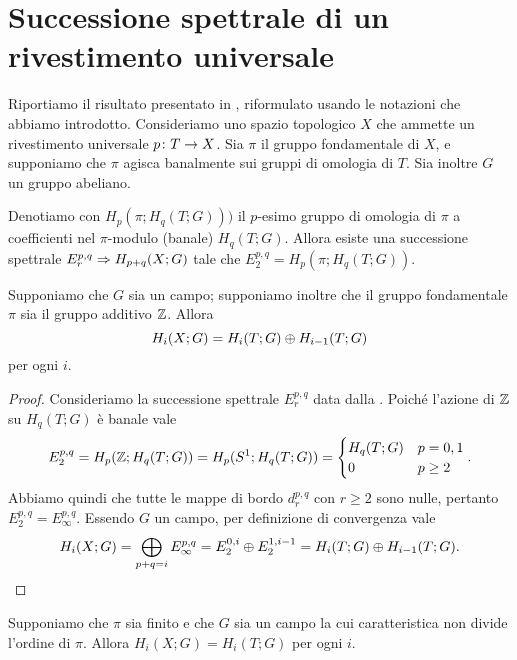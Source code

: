 \section{Successione spettrale di un rivestimento universale}
Riportiamo il risultato presentato in , riformulato usando le notazioni che abbiamo introdotto. Consideriamo uno spazio topologico $X$ che ammette un rivestimento universale $\map{p}{T}{X}$. Sia $\pi$ il gruppo fondamentale di $X$, e supponiamo che $\pi$ agisca banalmente sui gruppi di omologia di $T$. Sia inoltre $G$ un gruppo abeliano.
\begin{proposition}
Denotiamo con $H_p(\pi;H_q(T;G)))$ il $p$-esimo gruppo di omologia di $\pi$ a coefficienti nel $\pi$-modulo (banale) $H_q(T;G)$. Allora esiste una successione spettrale $E^{p,q}_r\Rightarrow H_{p+q}(X;G)$ tale che $E^{p,q}_2=H_p(\pi;H_q(T;G))$.
\end{proposition}
\begin{corollary}
Supponiamo che $G$ sia un campo; supponiamo inoltre che il gruppo fondamentale $\pi$ sia il gruppo additivo $\mathbb{Z}$. Allora
$$
H_i(X;G)=H_i(T;G)\mathbin{\oplus} H_{i-1}(T;G)
$$
per ogni $i$.
\end{corollary}
\begin{proof}
Consideriamo la successione spettrale $E^{p,q}_r$ data dalla . Poiché l'azione di $\mathbb{Z}$ su $H_q(T;G)$ è banale vale
$$
E^{p,q}_2=H_p(\mathbb{Z};H_q(T;G))=H_p(S^1;H_q(T;G))=
\begin{cases}
H_q(T;G)&p=0,1\\
0&p\ge 2
\end{cases}.
$$
Abbiamo quindi che tutte le mappe di bordo $d^{p,q}_r$ con $r\ge 2$ sono nulle, pertanto $E^{p,q}_2=E^{p,q}_\infty$. Essendo $G$ un campo, per definizione di convergenza vale
\[
H_i(X;G)=\bigoplus_{p+q=i}E^{p,q}_\infty=E^{0,i}_2\mathbin{\oplus} E^{1,i-1}_2=H_i(T;G)\mathbin{\oplus} H_{i-1}(T;G).\qedhere
\]
\end{proof}
\begin{corollary}
Supponiamo che $\pi$ sia finito e che $G$ sia un campo la cui caratteristica non divide l'ordine di $\pi$. Allora $H_i(X;G)=H_i(T;G)$ per ogni $i$.
\end{corollary}
